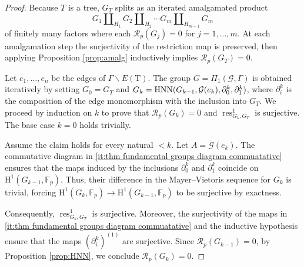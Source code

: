 \documentclass{amsart}
\theoremstyle{definition}
\theoremstyle{remark}
\DeclareMathOperator{\res}{res}
\newcommand{\HNN}{{\rm HNN}}
\newcommand{\FF}{\mathbb{F}}
\newcommand{\calR}{\mathcal{R}}
\newcommand{\calG}{\mathcal{G}}
\newcommand{\rmH}{\mathrm H}%
\begin{document}
\begin{proof}
Because $T$ is a tree, $G_T$ splits as an iterated amalgamated product
$$G_1 \amalg_{H_1} G_2 \amalg_{H_2} \cdots G_m \amalg_{H_{m-1}} G_m$$
of finitely many factors where each $\calR_p(G_j) = 0$ for $j=1,...,m$. At each amalgamation step the surjectivity of the restriction map is preserved, then applying Proposition \ref{prop:amalg} inductively implies $\calR_p(G_T)=0$.

Let $e_1,\dots,e_n$ be the edges of $\Gamma \smallsetminus E(\mathrm T)$. The group $G = \Pi_1(\calG,\Gamma)$ is obtained iteratively by setting $G_0 = G_T$ and $G_k = \HNN(G_{k-1}, \calG(e_k), \partial_0^k, \partial_1^k)$, where $\partial_i^k$ is the composition of the edge monomorphism with the inclusion into $G_T$. We proceed by induction on $k$ to prove that $\calR_p(G_k) = 0$ and $\res^1_{G_k,G_T}$ is surjective. The base case $k = 0$ holds trivially.

Assume the claim holds for every natural $< k$. Let $A = \calG(e_k)$. The commutative diagram in \ref{it:thm fundamental groups diagram commuatative} ensures that the maps induced by the inclusions $\partial_0^k$ and $\partial_1^k$ coincide on $\rmH^1(G_{k-1},\FF_p)$. Thus, their difference in the Mayer--Vietoris sequence for $G_k$ is trivial, forcing $\rmH^1(G_k,\FF_p) \to \rmH^1(G_{k-1},\FF_p)$ to be surjective by exactness. 

Consequently, $\res^1_{G_k,G_T}$ is surjective. Moreover, the surjectivity of the maps in \ref{it:thm fundamental groups diagram commuatative} and the inductive hypothesis ensure that the maps $(\partial_i^k)^{(1)}$ are surjective. Since $\calR_p(G_{k-1}) = 0$, by Proposition \ref{prop:HNN}, we conclude $\calR_p(G_k) = 0$.
\end{proof}
\end{document}
